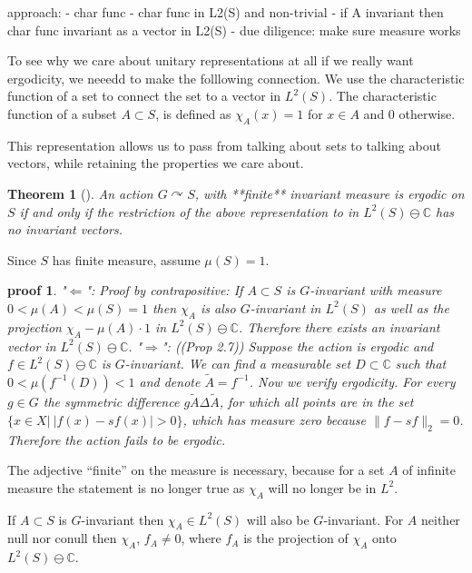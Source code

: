 \documentclass[
]{article}
\newtheorem{thm}{Theorem}
\newtheorem{pf}{proof}
\begin{document}
approach: - char func - char func in L2(S) and non-trivial - if A
invariant then char func invariant as a vector in L2(S) - due diligence:
make sure measure works

To see why we care about unitary representations at all if we really
want ergodicity, we neeedd to make the folllowing connection. We use the
characteristic function of a set to connect the set to a vector in
\(L^2(S)\). The characteristic function of a subset \(A\subset S\), is
defined as \(\chi_A(x) = 1\) for \(x \in A\) and \(0\) otherwise.

This representation allows us to pass from talking about sets to talking
about vectors, while retaining the properties we care about.

\begin{thm}[]
  An action $G\curvearrowright S$, with **finite** invariant measure is ergodic
  on $S$ if and only if the restriction of the above representation to  in
  $L^2(S) \ominus \mathbb{C}$ has no invariant vectors.
\end{thm}
  
Since \(S\) has finite measure, assume \(\mu(S) =1\).

\begin{pf}
"$\Leftarrow$": Proof by contrapositive: If $A\subset S$ is $G$-invariant with measure $0 < \mu(A) < \mu(S) = 1$ then $\chi_A$ is also $G$-invariant in $L^2(S)$ as well as the projection $\chi_A - \mu(A)\cdot 1$ in $L^2(S)\ominus \mathbb{C}$.
Therefore there exists an invariant vector in $L^2(S)\ominus \mathbb{C}$.
"$\Rightarrow$": (\cite{Kerr16}(Prop 2.7)) Suppose the action is ergodic and $f\in L^2(S)\ominus \mathbb{C}$ is $G$-invariant.
We can find a measurable set $D\subset \mathbb{C}$ such that $0<\mu(f^{-1}(D)) < 1$ and denote $\widetilde{A} = f^{-1}$. Now we verify ergodicity. For every $g\in G$ the symmetric difference $g\widetilde{A} \Delta \widetilde{A}$, for which all points are in the set $\{x \in X | \ |f(x)-sf(x)| > 0\}$, which has measure zero because $\|f- sf\|_2=0$. Therefore the action fails to be ergodic.
\end{pf}

The adjective ``finite'' on the measure is necessary, because for a set
\(A\) of infinite measure the statement is no longer true as \(\chi_A\)
will no longer be in \(L^2\).

If \(A\subset S\) is \(G\)-invariant then \(\chi_A\in L^2(S)\) will also
be \(G\)-invariant. 
For \(A\) neither null nor conull then
\(\chi_A\), \(f_A \neq 0\), where \(f_A\) is the projection of
\(\chi_A\) onto \(L^2(S) \ominus \mathbb{C}\).
\end{document}
